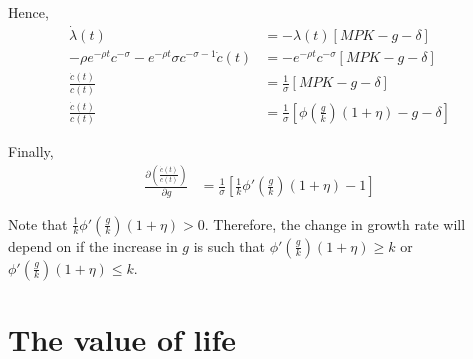 \documentclass[12pt]{article}
\newcommand{\1}{{\bf 1}} %
\begin{document}
\begin{enumerate}[(1)]
	Hence,
	\begin{align*}
	\dot{\lambda}(t) & = -\lambda(t) [MPK-g-\delta]\\
	-\rho e^{-\rho t}c^{-\sigma}- e^{-\rho t} \sigma c^{-\sigma-1}\dot{c}(t) & = -e^{-\rho t}c^{-\sigma}  [MPK-g-\delta]\\
	\frac{\dot{c}(t)}{c(t)} & = \frac{1}{\sigma} [MPK-g-\delta]\\
	\frac{\dot{c}(t)}{c(t)} & = \frac{1}{\sigma} \left[ \phi\left(\frac{g}{k}\right)(1+\eta)-g-\delta\right] 
	\end{align*}
	
	Finally,
		\begin{align*}
	\frac{\partial \left( \frac{\dot{c}(t)}{c(t)}\right)}{\partial g} & = \frac{1}{\sigma} \left[ \frac{1}{k}\phi'\left(\frac{g}{k}\right)(1+\eta)-1\right] 
	\end{align*}
	
	Note that $\frac{1}{k}\phi'\left(\frac{g}{k}\right)(1+\eta)>0$. Therefore, the change in growth rate will depend on if the increase in $g$ is such that $\phi'\left(\frac{g}{k}\right)(1+\eta) \geq k$ or $\phi'\left(\frac{g}{k}\right)(1+\eta) \leq k$. 
\end{enumerate}
	
	
\section*{The value of life}
	
\end{document}
